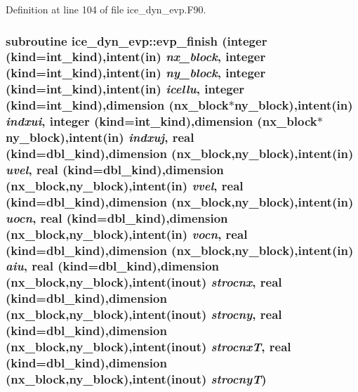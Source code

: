 Definition at line 104 of file ice\_\-dyn\_\-evp.F90.\hypertarget{namespaceice__dyn__evp_a98d3c4b7bf9a4ca30d3c1d133792920e}{
\subsubsection[{evp\_\-finish}]{\setlength{\rightskip}{0pt plus 5cm}subroutine ice\_\-dyn\_\-evp::evp\_\-finish (integer (kind=int\_\-kind),intent(in) {\em nx\_\-block}, \/  integer (kind=int\_\-kind),intent(in) {\em ny\_\-block}, \/  integer (kind=int\_\-kind),intent(in) {\em icellu}, \/  integer (kind=int\_\-kind),dimension (nx\_\-block$\ast$ny\_\-block),intent(in) {\em indxui}, \/  integer (kind=int\_\-kind),dimension (nx\_\-block$\ast$ny\_\-block),intent(in) {\em indxuj}, \/  real (kind=dbl\_\-kind),dimension (nx\_\-block,ny\_\-block),intent(in) {\em uvel}, \/  real (kind=dbl\_\-kind),dimension (nx\_\-block,ny\_\-block),intent(in) {\em vvel}, \/  real (kind=dbl\_\-kind),dimension (nx\_\-block,ny\_\-block),intent(in) {\em uocn}, \/  real (kind=dbl\_\-kind),dimension (nx\_\-block,ny\_\-block),intent(in) {\em vocn}, \/  real (kind=dbl\_\-kind),dimension (nx\_\-block,ny\_\-block),intent(in) {\em aiu}, \/  real (kind=dbl\_\-kind),dimension (nx\_\-block,ny\_\-block),intent(inout) {\em strocnx}, \/  real (kind=dbl\_\-kind),dimension (nx\_\-block,ny\_\-block),intent(inout) {\em strocny}, \/  real (kind=dbl\_\-kind),dimension (nx\_\-block,ny\_\-block),intent(inout) {\em strocnxT}, \/  real (kind=dbl\_\-kind),dimension (nx\_\-block,ny\_\-block),intent(inout) {\em strocnyT})}}
\label{namespaceice__dyn__evp_a98d3c4b7bf9a4ca30d3c1d133792920e}


